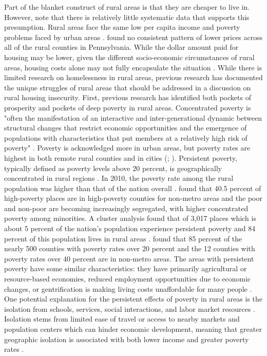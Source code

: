  Part of the blanket construct of rural areas is that they are cheaper to live in. However, \citep{kurre_is_2003} note that there is relatively little systematic data that supports this presumption. Rural areas face the same low per capita income and poverty problems faced by urban areas \citep{castle_place_2011}. \citet{zimmerman_does_2008} found no consistent pattern of lower prices across all of the rural counties in Pennsylvania. While the dollar amount paid for housing may be lower, given the different socio-economic circumstances of rural areas, housing costs alone may not fully encapsulate the situation \citep{kropczynski_insights_2012}.  While there is limited research on homelessness in rural areas, previous research has documented the unique struggles of rural areas that should be addressed in a discussion on rural housing insecurity. First, previous research has identified both pockets of prosperity and pockets of deep poverty in rural areas. Concentrated poverty is "often the manifestation of an interactive and inter-generational dynamic between structural changes that restrict economic opportunities and the emergence of populations with characteristics that put members at a relatively high risk of poverty" \citep[?]{thiede_spatial_2018}. Poverty is acknowledged more in urban areas, but poverty rates are highest in both remote rural counties and in cities  (\citealp{miller_persistent_2003}; \citealp{crandall_local_2004}). Persistent poverty, typically defined as poverty levels above 20 percent, is geographically concentrated in rural regions \citep{crandall_local_2004}. In 2010, the poverty rate among the rural population was higher than that of the nation overall \citep{burton_inequality_2013}. \citet{lichter_rural_2011} found that 40.5 percent of high-poverty places are in high-poverty counties for non-metro areas and the poor and non-poor are becoming increasingly segregated, with higher concentrated poverty among minorities. A cluster analysis found that of 3,017 places which is about 5 percent of the nation's population experience persistent poverty and 84 percent of this population lives in rural areas \citep{peters_typology_2009}. \citet{lichter_changing_2007} found that 85 percent of the nearly 500 counties with poverty rates over 20 percent and the 12 counties with poverty rates over 40 percent are in non-metro areas. The areas with persistent poverty have some similar characteristics: they have primarily agricultural or resource-based economies, reduced employment opportunities due to economic changes, or gentrification is making living costs unaffordable for many people \citep{robertson_rural_2007}. One potential explanation for the persistent effects of poverty in rural areas is the isolation from schools, services, social interactions, and labor market resources \citep{canto_rural_2014}. Isolation stems from limited ease of travel or access to nearby markets and population centers which can hinder economic development, meaning that greater geographic isolation is associated with both lower income and greater poverty rates \citep{blank_poverty_2005}. 
 
